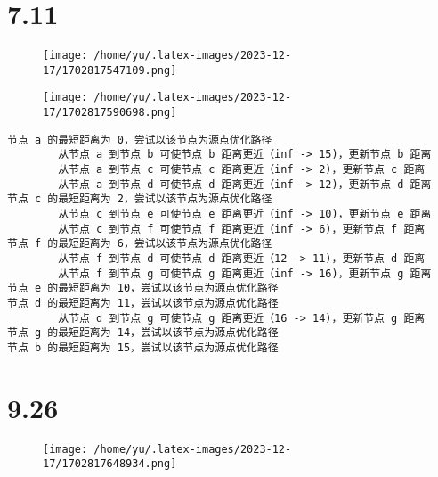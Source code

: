 \documentclass[14pt]{extarticle}
\begin{document}
\section{7.11}
\begin{figure}[H]
        \centering
        \texttt{[image: /home/yu/.latex-images/2023-12-17/1702817547109.png]}
\end{figure}

\begin{figure}[H]
        \centering
        \texttt{[image: /home/yu/.latex-images/2023-12-17/1702817590698.png]}
\end{figure}

\begin{verbatim}
节点 a 的最短距离为 0，尝试以该节点为源点优化路径
        从节点 a 到节点 b 可使节点 b 距离更近（inf -> 15)，更新节点 b 距离
        从节点 a 到节点 c 可使节点 c 距离更近（inf -> 2)，更新节点 c 距离
        从节点 a 到节点 d 可使节点 d 距离更近（inf -> 12)，更新节点 d 距离
节点 c 的最短距离为 2，尝试以该节点为源点优化路径
        从节点 c 到节点 e 可使节点 e 距离更近（inf -> 10)，更新节点 e 距离
        从节点 c 到节点 f 可使节点 f 距离更近（inf -> 6)，更新节点 f 距离
节点 f 的最短距离为 6，尝试以该节点为源点优化路径
        从节点 f 到节点 d 可使节点 d 距离更近（12 -> 11)，更新节点 d 距离
        从节点 f 到节点 g 可使节点 g 距离更近（inf -> 16)，更新节点 g 距离
节点 e 的最短距离为 10，尝试以该节点为源点优化路径
节点 d 的最短距离为 11，尝试以该节点为源点优化路径
        从节点 d 到节点 g 可使节点 g 距离更近（16 -> 14)，更新节点 g 距离
节点 g 的最短距离为 14，尝试以该节点为源点优化路径
节点 b 的最短距离为 15，尝试以该节点为源点优化路径
\end{verbatim}

\section{9.26}
\begin{figure}[H]
        \centering
        \texttt{[image: /home/yu/.latex-images/2023-12-17/1702817648934.png]}
\end{figure}

\inputminted{cpp}{9.26.cpp}
\end{document}

